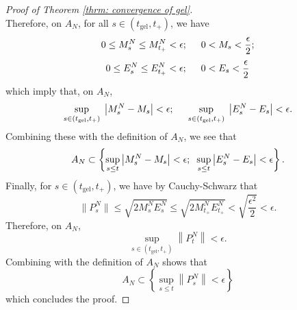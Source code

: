 \begin{proof}[Proof of Theorem \ref{thrm: convergence of gel}]
\begin{equation}
\end{equation} Therefore, on $A_N$, for all $s\in (t_\text{gel}, t_+)$, we have \begin{equation}
    0\leq M^N_s\leq M^N_{t_+}<\epsilon; \hspace{0.5cm} 0<M_s<\frac{\epsilon}{2};
\end{equation}
\begin{equation}
    0\leq E^N_s\leq E^N_{t_+}<\epsilon; \hspace{0.5cm} 0<E_s<\frac{\epsilon}{2}
\end{equation} which imply that, on $A_N$, \begin{equation}
    \sup_{s\in (t_\text{gel}, t_+)} \hspace{0.1cm}\left|M^N_s-M_s\right|< \epsilon;\hspace{0.5cm}\sup_{s\in (t_\text{gel}, t_+)} \hspace{0.1cm}\left|E^N_s-E_s\right|< \epsilon.
\end{equation} Combining these with the definition of $A_N$, we see that \begin{equation}
    A_N\subset\left\{\sup_{s\leq t} \left|M^N_s - M_s\right|<\epsilon; \hspace{0.2cm}\sup_{s\leq t} \left|E^N_s - E_s\right|<\epsilon \right\}.
\end{equation}
Finally, for $s\in (t_\text{gel},t_+)$, we have by Cauchy-Schwarz that \begin{equation}
    \|P^N_s\|\leq \sqrt{2M^N_sE^N_s} \leq \sqrt{2 M^N_{t_+}E^N_{t_+}}<\sqrt{\frac{\epsilon^2}{2}}<\epsilon.
\end{equation} Therefore, on $A_N$, \begin{equation}
    \sup_{s \in (t_\text{gel}, t_+)} \left\|P^N_t\right\| <\epsilon.
\end{equation} Combining with the definition of $A_N$ shows that \begin{equation}
    A_N\subset\left\{\sup_{s\leq t} \left\|P^N_s\right\|<\epsilon \right\}
\end{equation} which concludes the proof.
\end{proof} 

